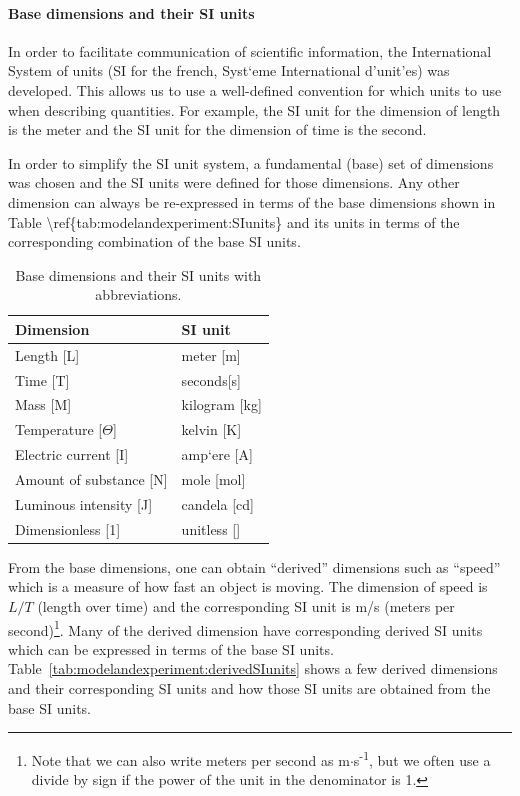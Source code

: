 \paragraph{Base dimensions and their SI units}

In order to facilitate communication of scientific information, the International System of units (SI for the french, Syst`eme International d'unit'es) was developed. This allows us to use a well-defined convention for which units to use when describing quantities. For example, the SI unit for the dimension of length is the meter and the SI unit for the dimension of time is the second.

In order to simplify the SI unit system, a fundamental (base) set of dimensions was chosen and the SI units were defined for those dimensions. Any other dimension can always be re-expressed in terms of the base dimensions shown in Table {\textbackslash}ref\{tab:modelandexperiment:SIunits\} and its units in terms of the corresponding combination of the base SI units.

\begin{table}
\centering
\caption[]{Base dimensions and their SI units with abbreviations.}
\label{tab:modelandexperiment:SIunits}
\begin{tabular}{p{}p{}}
\toprule
\textbf{Dimension} & \textbf{SI unit} \\
\hline
Length [L] & meter [m] \\
Time [T] & seconds[s] \\
Mass [M] & kilogram [kg] \\
Temperature [$\Theta$] & kelvin [K] \\
Electric current [I] & amp`ere [A] \\
Amount of substance [N] & mole [mol] \\
Luminous intensity [J] & candela [cd] \\
Dimensionless [1] & unitless [] \\
\bottomrule
\end{tabular}
\end{table}

From the base dimensions, one can obtain ``derived'' dimensions such as ``speed'' which is a measure of how fast an object is moving. The dimension of speed is $L/T$ (length over time) and the corresponding SI unit is m/s (meters per second)\footnote{Note that we can also write meters per second as m$\cdot$s\textsuperscript{-1}, but we often use a divide by sign if the power of the unit in the denominator is 1.}. Many of the derived dimension have corresponding derived SI units which can be expressed in terms of the base SI units. Table~\ref{tab:modelandexperiment:derivedSIunits} shows a few derived dimensions and their corresponding SI units and how those SI units are obtained from the base SI units.

